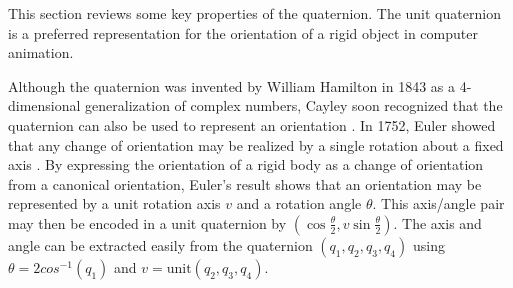 \documentclass[12pt]{article}
\begin{document}
This section reviews some key properties of the quaternion.
The unit quaternion is a preferred representation for the orientation
of a rigid object in computer animation.


Although the quaternion was invented by William Hamilton in 1843
as a 4-dimensional generalization of complex numbers,
Cayley soon recognized that the quaternion can also be used to represent an orientation
\cite{coxeter61}.
In 1752, Euler showed that 
any change of orientation may be realized by a single rotation about a fixed axis
\cite{goldstein50}. %
%
%
By expressing the orientation of a rigid body as 
a change of orientation from a canonical orientation, 
Euler's result shows that an orientation may be represented by 
a unit rotation axis $v$ and a rotation angle $\theta$.
This axis/angle pair may then be encoded in a unit quaternion by
$(\cos \frac{\theta}{2}, v \sin \frac{\theta}{2})$.
The axis and angle can be extracted easily from the quaternion $(q_1,q_2,q_3,q_4)$
using $\theta = 2 cos^{-1}(q_1)$ and $v = \mbox{unit}(q_2,q_3,q_4)$.
\end{document}
